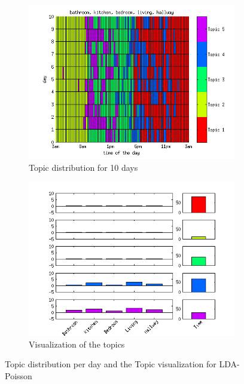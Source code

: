 \documentclass[11pt,a4paper]{article}
\begin{document}
\begin{figure}[h!]
 \centering
 \begin{subfigure}[b]{0.45\linewidth}
  \centering
  \includegraphics[width=\textwidth]{Pictures/TopDayHN2TS96k5Pois.png}
  \caption{Topic distribution for 10 days}
  \label{fig:PoisDay96}
 \end{subfigure}
 \begin{subfigure}[b]{0.45\linewidth}
  \centering
  \includegraphics[width=\textwidth]{Pictures/TopVisuHN2TS96k5Pois.png}
  \caption{Visualization of the topics}
  \label{fig:PoisTopVisu96}
 \end{subfigure}
 \caption{Topic distribution per day and the Topic visualization for LDA-Poisson}
 \label{fig:Pois96}
\end{figure}
\end{document}
